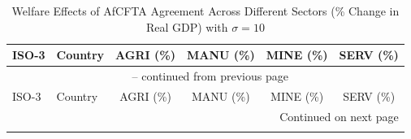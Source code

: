 
\begin{center}
	\begingroup\footnotesize {}
	\begin{longtable}{llcccc}
		\caption{Welfare Effects of AfCFTA Agreement Across Different Sectors (\% Change in Real GDP) with $\sigma = 10$ \label{table_a_6}} \\
		
		
		\toprule
		\toprule
		ISO-3 & Country & AGRI (\%) & MANU (\%) & MINE (\%) & SERV (\%) \\ 
		\toprule
		\endfirsthead
		
		\multicolumn{6}{c}{{\tablename\ \thetable{} -- continued from previous page}} \\ 
		\toprule
		ISO-3 & Country & AGRI (\%) & MANU (\%) & MINE (\%) & SERV (\%) \\ 
		\toprule
		\endhead
		
		\bottomrule \multicolumn{6}{r}{{Continued on next page}} \\ 
		\endfoot
		
		\bottomrule
		\bottomrule
		\endlastfoot


\end{longtable}
\end{center}
